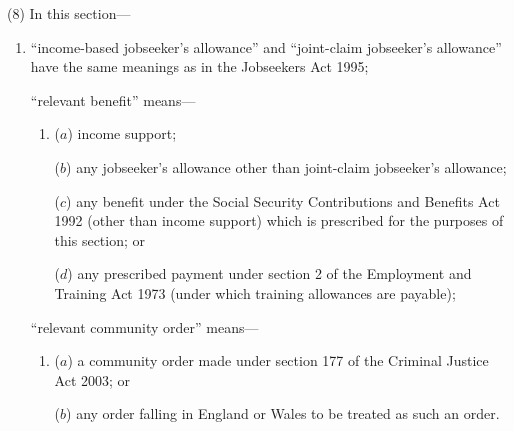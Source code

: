 \documentclass[12pt,a4paper]{article}
\begin{document}
(8) In this section—
\begin{enumerate}\item[]
    “income-based jobseeker’s allowance” and “joint-claim jobseeker’s allowance” have the same meanings as in the Jobseekers Act 1995;

    “relevant benefit” means—
\begin{enumerate}\item[]
    ($a$) 
    income support;

    ($b$) 
    any jobseeker’s allowance other than joint-claim jobseeker’s allowance;

    ($c$) 
    any benefit under the Social Security Contributions and Benefits Act 1992 (other than income support) which is prescribed for the purposes of this section; or

    ($d$) 
    any prescribed payment under section 2 of the Employment and Training Act 1973 (under which training allowances are payable);
\end{enumerate}

%
%
%
%
%

“relevant community order” means—
\begin{enumerate}\item[]
($a$) a community order made under section 177 of the Criminal Justice Act 2003; or

($b$) any order falling in England or Wales to be treated as such an order.
\end{enumerate}
\end{enumerate}
\end{document}
